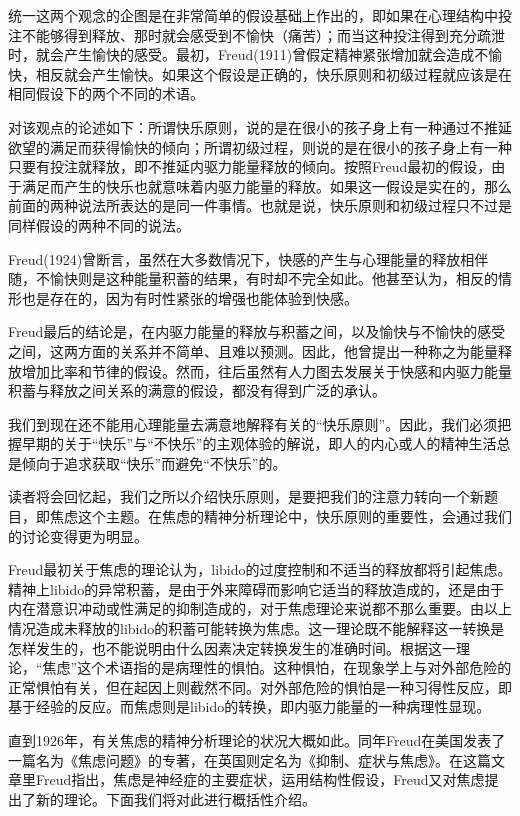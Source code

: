 \documentclass[UTF8,10pt,a4paper,openany]{book}
\begin{document}
统一这两个观念的企图是在非常简单的假设基础上作出的，即如果在心理结构中投注不能够得到释放、那时就会感受到不愉快（痛苦）；而当这种投注得到充分疏泄时，就会产生愉快的感受。最初，Freud(1911)曾假定精神紧张增加就会造成不愉快，相反就会产生愉快。如果这个假设是正确的，快乐原则和初级过程就应该是在相同假设下的两个不同的术语。

对该观点的论述如下：所谓快乐原则，说的是在很小的孩子身上有一种通过不推延欲望的满足而获得愉快的倾向；所谓初级过程，则说的是在很小的孩子身上有一种只要有投注就释放，即不推延内驱力能量释放的倾向。按照Freud最初的假设，由于满足而产生的快乐也就意味着内驱力能量的释放。如果这一假设是实在的，那么前面的两种说法所表达的是同一件事情。也就是说，快乐原则和初级过程只不过是同样假设的两种不同的说法。

Freud(1924)曾断言，虽然在大多数情况下，快感的产生与心理能量的释放相伴随，不愉快则是这种能量积蓄的结果，有时却不完全如此。他甚至认为，相反的情形也是存在的，因为有时性紧张的增强也能体验到快感。

Freud最后的结论是，在内驱力能量的释放与积蓄之间，以及愉快与不愉快的感受之间，这两方面的关系并不简单、且难以预测。因此，他曾提出一种称之为能量释放增加比率和节律的假设。然而，往后虽然有人力图去发展关于快感和内驱力能量积蓄与释放之间关系的满意的假设，都没有得到广泛的承认。

我们到现在还不能用心理能量去满意地解释有关的“快乐原则”。因此，我们必须把握早期的关于“快乐”与“不快乐”的主观体验的解说，即人的内心或人的精神生活总是倾向于追求获取“快乐”而避免“不快乐”的。

读者将会回忆起，我们之所以介绍快乐原则，是要把我们的注意力转向一个新题目，即焦虑这个主题。在焦虑的精神分析理论中，快乐原则的重要性，会通过我们的讨论变得更为明显。

Freud最初关于焦虑的理论认为，libido的过度控制和不适当的释放都将引起焦虑。精神上libido的异常积蓄，是由于外来障碍而影响它适当的释放造成的，还是由于内在潜意识冲动或性满足的抑制造成的，对于焦虑理论来说都不那么重要。由以上情况造成未释放的libido的积蓄可能转换为焦虑。这一理论既不能解释这一转换是怎样发生的，也不能说明由什么因素决定转换发生的准确时间。根据这一理论，“焦虑”这个术语指的是病理性的惧怕。这种惧怕，在现象学上与对外部危险的正常惧怕有关，但在起因上则截然不同。对外部危险的惧怕是一种习得性反应，即基于经验的反应。而焦虑则是libido的转换，即内驱力能量的一种病理性显现。

直到1926年，有关焦虑的精神分析理论的状况大概如此。同年Freud在美国发表了一篇名为《焦虑问题》的专著，在英国则定名为《抑制、症状与焦虑》。在这篇文章里Freud指出，焦虑是神经症的主要症状，运用结构性假设，Freud又对焦虑提出了新的理论。下面我们将对此进行概括性介绍。
\end{document}
